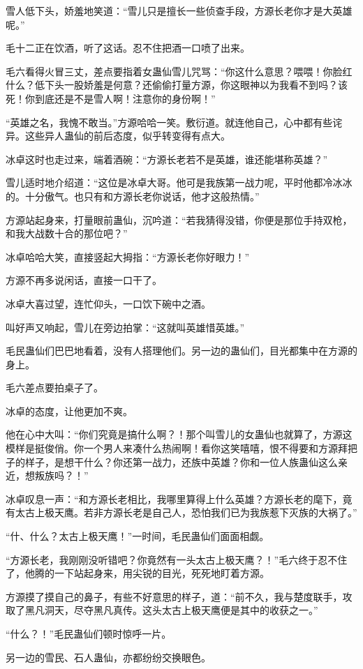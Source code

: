 \begin{this_body}
雪人低下头，娇羞地笑道：“雪儿只是擅长一些侦查手段，方源长老你才是大英雄呢。”

毛十二正在饮酒，听了这话。忍不住把酒一口喷了出来。

毛六看得火冒三丈，差点要指着女蛊仙雪儿咒骂：“你这什么意思？喂喂！你脸红什么？低下头一股娇羞是何意？还偷偷打量方源，你这眼神以为我看不到吗？该死！你到底还是不是雪人啊！注意你的身份啊！”

“英雄之名，我愧不敢当。”方源哈哈一笑。敷衍道。就连他自己，心中都有些诧异。这些异人蛊仙的前后态度，似乎转变得有点大。

冰卓这时也走过来，端着酒碗：“方源长老若不是英雄，谁还能堪称英雄？”

雪儿适时地介绍道：“这位是冰卓大哥。他可是我族第一战力呢，平时他都冷冰冰的。十分傲气。也只有和方源长老你说话，他才这般热情。”

方源站起身来，打量眼前蛊仙，沉吟道：“若我猜得没错，你便是那位手持双枪，和我大战数十合的那位吧？”

冰卓哈哈大笑，直接竖起大拇指：“方源长老你好眼力！”

方源不再多说闲话，直接一口干了。

冰卓大喜过望，连忙仰头，一口饮下碗中之酒。

叫好声又响起，雪儿在旁边拍掌：“这就叫英雄惜英雄。”

毛民蛊仙们巴巴地看着，没有人搭理他们。另一边的蛊仙们，目光都集中在方源的身上。

毛六差点要拍桌子了。

冰卓的态度，让他更加不爽。

他在心中大叫：“你们究竟是搞什么啊？！那个叫雪儿的女蛊仙也就算了，方源这模样是挺俊俏。你一个男人来凑什么热闹啊！看你这笑嘻嘻，恨不得要和方源拜把子的样子，是想干什么？你还第一战力，还族中英雄？你和一位人族蛊仙这么亲近，想叛族吗？！”

冰卓叹息一声：“和方源长老相比，我哪里算得上什么英雄？方源长老的麾下，竟有太古上极天鹰。若非方源长老是自己人，恐怕我们已为我族惹下灭族的大祸了。”

“什、什么？太古上极天鹰！”一时间，毛民蛊仙们面面相觑。

“方源长老，我刚刚没听错吧？你竟然有一头太古上极天鹰？！”毛六终于忍不住了，他腾的一下站起身来，用尖锐的目光，死死地盯着方源。

方源摸了摸自己的鼻子，有些不好意思的样子，道：“前不久，我与楚度联手，攻取了黑凡洞天，尽夺黑凡真传。这头太古上极天鹰便是其中的收获之一。”

“什么？！”毛民蛊仙们顿时惊呼一片。

另一边的雪民、石人蛊仙，亦都纷纷交换眼色。


\end{this_body}
